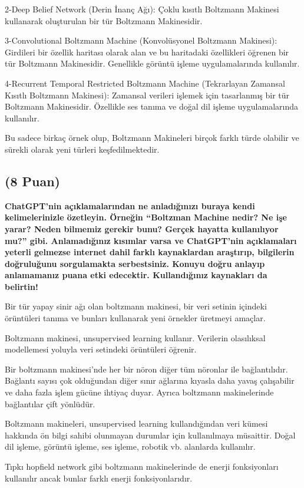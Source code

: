 \documentclass[11pt]{article}
\begin{document}
2-Deep Belief Network (Derin İnanç Ağı): Çoklu kısıtlı Boltzmann Makinesi kullanarak oluşturulan bir tür Boltzmann Makinesidir.

3-Convolutional Boltzmann Machine (Konvolüsyonel Boltzmann Makinesi): Girdileri bir özellik haritası olarak alan ve bu haritadaki özellikleri öğrenen bir tür Boltzmann Makinesidir. Genellikle görüntü işleme uygulamalarında kullanılır.

4-Recurrent Temporal Restricted Boltzmann Machine (Tekrarlayan Zamansal Kısıtlı Boltzmann Makinesi): Zamansal verileri işlemek için tasarlanmış bir tür Boltzmann Makinesidir. Özellikle ses tanıma ve doğal dil işleme uygulamalarında kullanılır.

Bu sadece birkaç örnek olup, Boltzmann Makineleri birçok farklı türde olabilir ve sürekli olarak yeni türleri keşfedilmektedir.


\subsection{(8 Puan)} \textbf{ChatGPT’nin açıklamalarından ne anladığınızı buraya kendi kelimelerinizle özetleyin. Örneğin ``Boltzman Machine nedir? Ne işe yarar? Neden bilmemiz gerekir bunu? Gerçek hayatta kullanılıyor mu?'' gibi. Anlamadığınız kısımlar varsa ve ChatGPT’nin açıklamaları yeterli gelmezse internet dahil farklı kaynaklardan araştırıp, bilgilerin doğruluğunu sorgulamakta serbestsiniz. Konuyu doğru anlayıp anlamamanız puana etki edecektir. Kullandığınız kaynakları da belirtin!}

Bir tür yapay sinir ağı olan boltzmann makinesi,  bir veri setinin içindeki örüntüleri tanıma ve bunları kullanarak yeni örnekler üretmeyi amaçlar.

Boltzmann makinesi, unsupervised learning kullanır. Verilerin olasılıksal modellemesi yoluyla veri setindeki örüntüleri öğrenir.


Bir boltzmann makinesi'nde  her bir nöron diğer tüm nöronlar ile bağlantılıdır. Bağlantı sayısı çok olduğundan diğer sınır ağlarına kıyasla daha yavaş çalışabilir ve daha fazla işlem gücüne ihtiyaç duyar. Ayrıca boltzmann makinelerinde  bağlantılar çift yönlüdür.

Boltzmann makineleri,  unsupervised learning  kullandığından veri kümesi hakkında ön bilgi sahibi olunmayan durumlar için kullanılmaya müsaittir.  Doğal dil işleme, görüntü işleme, ses işleme, robotik vb. alanlarda kullanılır.

Tıpkı hopfield  network gibi boltzmann makinelerinde de  enerji fonksiyonları kullanılır  ancak bunlar farklı enerji fonksiyonlarıdır.
\end{document}
